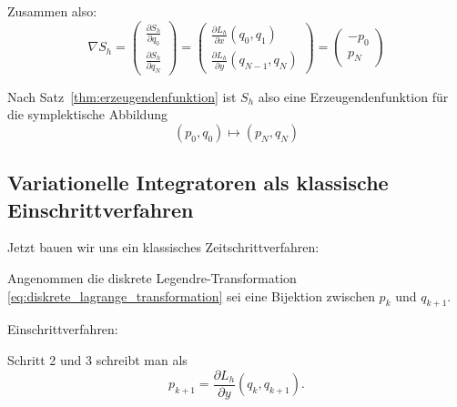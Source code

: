 Zusammen also:
\begin{equation*}
	\nabla S_h = \begin{pmatrix}
	\frac{\partial S_h}{\partial q_0} \\
	\frac{\partial S_h}{\partial q_N}
	\end{pmatrix} 
	=
	\begin{pmatrix}
	\frac{\partial L_h}{\partial x} (q_0, q_1) \\
	\frac{\partial L_h}{\partial y} (q_{N-1},q_N)
	\end{pmatrix}
	=
	\begin{pmatrix}
	- p_0 \\ p_N
	\end{pmatrix}
\end{equation*}

Nach Satz~\ref{thm:erzeugendenfunktion} ist $S_h$ also eine Erzeugendenfunktion für die symplektische Abbildung
\begin{equation*}
	(p_0, q_0) \mapsto (p_N, q_N)
\end{equation*} 



\subsection{Variationelle Integratoren als klassische Einschrittverfahren}

Jetzt bauen wir uns ein klassisches Zeitschrittverfahren:

Angenommen die diskrete Legendre-Transformation \eqref{eq:diskrete_lagrange_transformation} sei eine Bijektion zwischen $p_k$ und $q_{k+1}$.

Einschrittverfahren:
\begin{center}
\end{center}
Schritt 2 und 3 schreibt man als
\begin{equation*}
	p_{k+1} = \frac{\partial L_h}{\partial y} (q_k, q_{k+1}).
\end{equation*}

